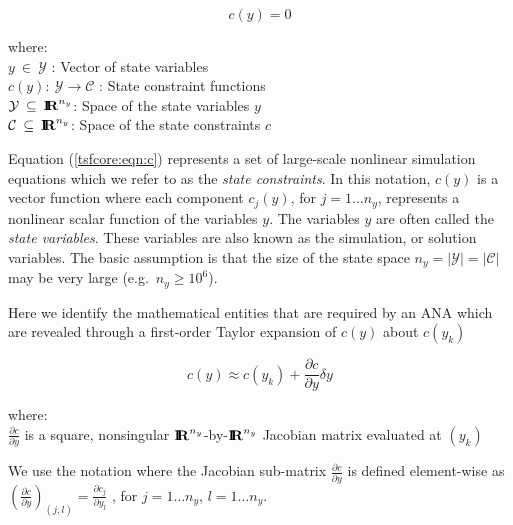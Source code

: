 \documentclass[10pt,fleqn]{article}
\begin{document}
{\bsinglespace
\begin{equation}
c(y)  = 0
\label{tsfcore:eqn:c}
\end{equation}
\begin{tabbing}
\hspace{\mathindent}where:\hspace{5ex}\= \\
\>	$y \:\in\:\mathcal{Y}$ : Vector of state variables \\
\>	$c(y) : \:\mathcal{Y} \rightarrow \mathcal{C}$ : State constraint functions \\
\>	$\mathcal{Y} \:\subseteq\:\mbox{\textbf{I}}\hspace{-0.6ex}\mbox{\textbf{R}}^{n_y}$: Space of the state variables $y$ \\
\>	$\mathcal{C} \:\subseteq\:\mbox{\textbf{I}}\hspace{-0.6ex}\mbox{\textbf{R}}^{n_y}$: Space of the state constraints $c$
\end{tabbing}
\esinglespace}

Equation (\ref{tsfcore:eqn:c}) represents a set of large-scale
nonlinear simulation equations which we refer to as the \textit{state
constraints}.  In this notation, $c(y)$ is a vector function where
each component $c_j(y)$, for $j = 1 \ldots n_y$, represents a
nonlinear scalar function of the variables $y$.  The variables $y$ are
often called the {\em state variables}.  These variables are also
known as the simulation, or solution variables.  The basic assumption
is that the size of the state space $n_y = |\mathcal{Y}| =
|\mathcal{C}|$ may be very large (e.g.~$n_y \ge 10^{6}$).

Here we identify the mathematical entities that are required by an ANA
which are revealed through a first-order Taylor expansion of $c(y)$
about $c(y_k)$

\begin{equation}
c(y) \approx c(y_k) + \frac{\partial c}{\partial y} \delta y
\label{tsfcore:eqn:c_taylor}
\end{equation}
\begin{tabbing}
\hspace{\mathindent}where:\hspace{5ex}\= \\
\>	$\frac{\partial c}{\partial y}$ is a square, nonsingular $\mbox{\textbf{I}}\hspace{-0.6ex}\mbox{\textbf{R}}^{n_y}$-by-$\mbox{\textbf{I}}\hspace{-0.6ex}\mbox{\textbf{R}}^{n_y}$
    Jacobian matrix evaluated at $(y_k)$
\end{tabbing}

We use the notation where the Jacobian sub-matrix $\frac{\partial
c}{\partial y}$ is defined element-wise as $\left( \frac{\partial
c}{\partial y} \right)_{(j,l)} = \frac{\partial c_j}{\partial y_l}$ ,
for $j = 1 \ldots n_y$, $l = 1 \ldots n_y$.
\end{document}
